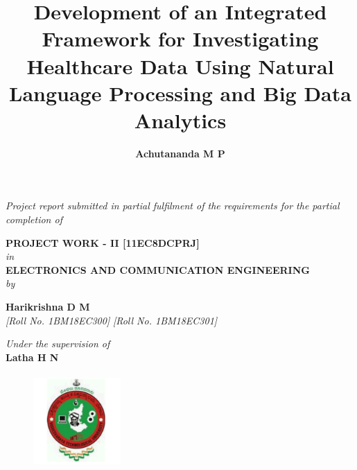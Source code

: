 \title{\fontsize{16pt}{19.2pt}\selectfont\bf{Development of an Integrated Framework for Investigating Healthcare Data Using Natural Language Processing and Big Data Analytics}}
\date{}
\maketitle
\thispagestyle{empty}

\begin{center}
\vspace*{-8mm}
\textit{Project report submitted in partial fulfilment of the requirements for the partial completion of}

\vspace*{6mm}

{\fontsize{14pt}{16.8pt}\selectfont\textbf{PROJECT WORK - II [11EC8DCPRJ]}} \\ \vspace*{3mm}
{\fontsize{14pt}{16.8pt}\selectfont\textit{in}} \\
\vspace*{3mm}
%
{\fontsize{14pt}{16.8pt}\selectfont\textbf{ELECTRONICS AND COMMUNICATION ENGINEERING}} \\

\vspace*{2mm}
{\fontsize{14pt}{16.8pt}\selectfont\textit{by}} \\
\vspace*{3mm}

\author{\fontsize{14pt}{16.8pt}\selectfont\textbf{Achutananda M P}}  \hspace*{12mm} {\fontsize{14pt}{16.8pt}\selectfont\textbf{Harikrishna D M}}\\
\vspace*{2mm}
{\fontsize{12pt}{14.4pt}\selectfont\textit{[Roll No. 1BM18EC300]} \hspace*{12mm} \selectfont\textit{[Roll No. 1BM18EC301]} } \\



\vspace*{3mm}

\vspace*{4mm}\fontsize{14pt}{16.8pt}\selectfont\textit{Under the supervision of} \\
\vspace*{2mm}\fontsize{14pt}{16.8pt}\selectfont\textbf{Latha H N} \\
\vspace*{8mm}

\begin{figure}[!ht]
\centering
\includegraphics[height=36.068mm,width=33.274mm]{VTU_Logo}
\end{figure}
\vspace*{3mm}


\end{center}
